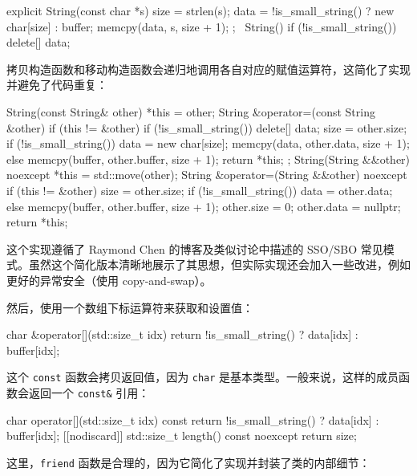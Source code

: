 \begin{codebox}[text]
explicit String(const char *s) {
    size = strlen(s);
    data = !is_small_string() ? new char[size] : buffer;
    memcpy(data, s, size + 1);
};
~String() {
    if (!is_small_string()) {
        delete[] data;
    }
}
\end{codebox}

\label{idx:605}
拷贝构造函数和移动构造函数会递归地调用各自对应的赋值运算符，这简化了实现并避免了代码重复：

\begin{codebox}[cpp]
String(const String& other) {*this = other;}
    String &operator=(const String &other) {
        if (this != &other) {
            if (!is_small_string()) {
                delete[] data;
        }
       size = other.size;
       if (!is_small_string()) {
           data = new char[size];
           memcpy(data, other.data, size + 1);
        } else {
            memcpy(buffer, other.buffer, size + 1);
        }
    }
    return *this;
};
String(String &&other) noexcept { *this = std::move(other); }
String &operator=(String &&other) noexcept {
    if (this != &other) {
        size = other.size;
        if (!is_small_string()) {
            data = other.data;
        } else {
            memcpy(buffer, other.buffer, size + 1);
        }
        other.size = 0;
        other.data = nullptr;
        }
    return *this;
}
\end{codebox}

\label{idx:606}
这个实现遵循了 Raymond Chen 的博客及类似讨论中描述的 SSO/SBO 常见模式。虽然这个简化版本清晰地展示了其思想，但实际实现还会加入一些改进，例如更好的异常安全（使用 copy-and-swap）。

然后，使用一个数组下标运算符来获取和设置值：

\begin{codebox}[cpp]
char &operator[](std::size_t idx) {
    return !is_small_string() ? data[idx] : buffer[idx];
}
\end{codebox}

这个 \texttt{const} 函数会拷贝返回值，因为 \texttt{char} 是基本类型。一般来说，这样的成员函数会返回一个 \texttt{const\&} 引用：

\begin{codebox}[cpp]
char operator[](std::size_t idx) const {
    return !is_small_string() ? data[idx] : buffer[idx];
}
[[nodiscard]] std::size_t length() const noexcept { return size; }
\end{codebox}

这里，\texttt{friend} 函数是合理的，因为它简化了实现并封装了类的内部细节：

